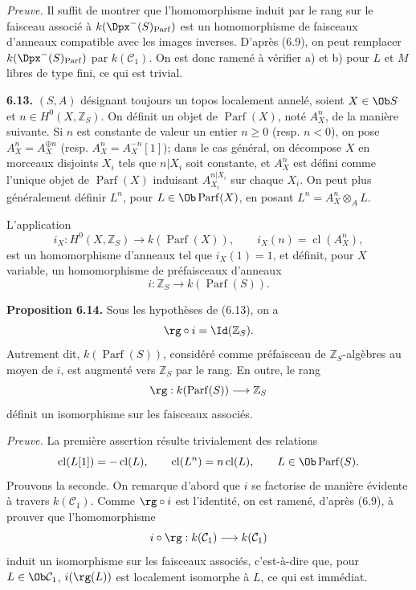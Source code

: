 \documentclass[11pt]{article}
\newcommand{\cl}{\operatorname{cl}}
\newcommand{\Parf}{\operatorname{Parf}}
\begin{document}
\providecommand{\End}{\operatorname{End}}
\providecommand{\tr}{\operatorname{tr}}

\emph{Preuve.} Il suffit de montrer que l'homomorphisme induit par le rang sur le faisceau associé à \(k(\Dpx^-(S)_{\Parf})\) est un homomorphisme de faisceaux d'anneaux compatible avec les images inverses. D'après (6.9), on peut remplacer \(k(\Dpx^-(S)_{\Parf})\) par \(k(\mathcal C_1)\). On est donc ramené à vérifier a) et b) pour \(L\) et \(M\) libres de type fini, ce qui est trivial.

\textbf{6.13.} \((S,A)\) désignant toujours un topos localement annelé, soient \(X\in\Ob S\) et \(n\in H^0(X,\mathbb Z_S)\). On définit un objet de \(\Parf(X)\), noté \(A_X^n\), de la manière suivante. Si \(n\) est constante de valeur un entier \(n\geq0\) (resp. \(n<0\)), on pose \(A_X^n=A_X^{\oplus n}\) (resp. \(A_X^n=A_X^{-n}[1]\)); dans le cas général, on décompose \(X\) en morceaux disjoints \(X_i\) tels que \(n|X_i\) soit constante, et \(A_X^n\) est défini comme l'unique objet de \(\Parf(X)\) induisant \(A_{X_i}^{n|X_i}\) sur chaque \(X_i\). On peut plus généralement définir \(L^n\), pour \(L\in\Ob\Parf(X)\), en posant \(L^n=A_X^n\otimes_AL\).

L'application
\[
  i_X:H^0(X,\mathbb Z_S)\longrightarrow k(\Parf(X)),
  \qquad i_X(n)=\cl(A_X^n),
\]
est un homomorphisme d'anneaux tel que \(i_X(1)=1\), et définit, pour \(X\) variable, un homomorphisme de préfaisceaux d'anneaux
\[
  i:\mathbb Z_S\longrightarrow k(\Parf(S)).
\]

\textbf{Proposition 6.14.} Sous les hypothèses de (6.13), on a
\[
  \rg\circ i=\Id(\mathbb Z_S).
\]
Autrement dit, \(k(\Parf(S))\), considéré comme préfaisceau de \(\mathbb Z_S\)-algèbres au moyen de \(i\), est augmenté vers \(\mathbb Z_S\) par le rang. En outre, le rang
\[
  \rg:k(\Parf(S))\longrightarrow\mathbb Z_S
\]
définit un isomorphisme sur les faisceaux associés.

\emph{Preuve.} La première assertion résulte trivialement des relations
\[
  \cl(L[1])=-\cl(L),\qquad \cl(L^n)=n\cl(L),
  \qquad L\in\Ob\Parf(S).
\]
Prouvons la seconde. On remarque d'abord que \(i\) se factorise de manière évidente à travers \(k(\mathcal C_1)\). Comme \(\rg\circ i\) est l'identité, on est ramené, d'après (6.9), à prouver que l'homomorphisme
\[
  i\circ\rg:k(\mathcal C_1)\longrightarrow k(\mathcal C_1)
\]
induit un isomorphisme sur les faisceaux associés, c'est-à-dire que, pour \(L\in\Ob\mathcal C_1\), \(i(\rg(L))\) est localement isomorphe à \(L\), ce qui est immédiat.
\end{document}
